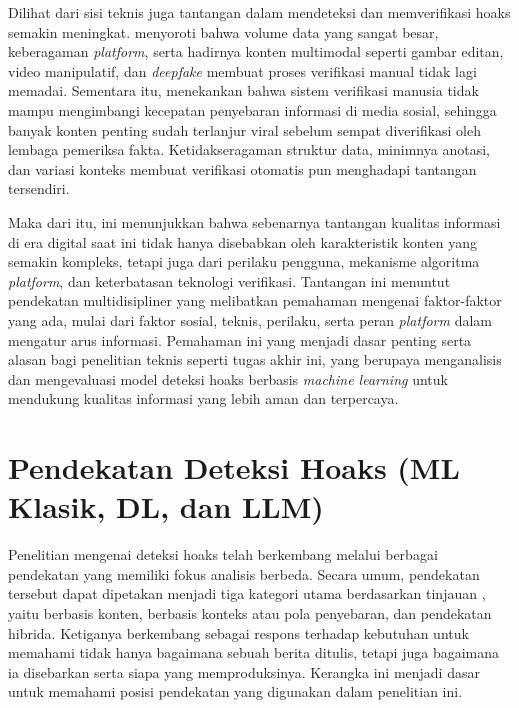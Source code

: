 Dilihat dari sisi teknis juga tantangan dalam mendeteksi dan memverifikasi hoaks semakin meningkat. \textcite{emilremus2025} menyoroti bahwa volume data yang sangat besar, keberagaman \textit{platform}, serta hadirnya konten multimodal seperti gambar editan, video manipulatif, dan \textit{deepfake} membuat proses verifikasi manual tidak lagi memadai. Sementara itu, \textcite{alghamdi2024comprehensive} menekankan bahwa sistem verifikasi manusia tidak mampu mengimbangi kecepatan penyebaran informasi di media sosial, sehingga banyak konten penting sudah terlanjur viral sebelum sempat diverifikasi oleh lembaga pemeriksa fakta. Ketidakseragaman struktur data, minimnya anotasi, dan variasi konteks membuat verifikasi otomatis pun menghadapi tantangan tersendiri.

Maka dari itu, ini menunjukkan bahwa sebenarnya tantangan kualitas informasi di era digital saat ini tidak hanya disebabkan oleh karakteristik konten yang semakin kompleks, tetapi juga dari perilaku pengguna, mekanisme algoritma \textit{platform}, dan keterbatasan teknologi verifikasi. Tantangan ini menuntut pendekatan multidisipliner yang melibatkan pemahaman mengenai faktor-faktor yang ada, mulai dari faktor sosial, teknis, perilaku, serta peran \textit{platform} dalam mengatur arus informasi. Pemahaman ini yang menjadi dasar penting serta alasan bagi penelitian teknis seperti tugas akhir ini, yang berupaya menganalisis dan mengevaluasi model deteksi hoaks berbasis \textit{machine learning} untuk mendukung kualitas informasi yang lebih aman dan terpercaya.


\section{Pendekatan Deteksi Hoaks (ML Klasik, DL, dan LLM)}

Penelitian mengenai deteksi hoaks telah berkembang melalui berbagai pendekatan yang memiliki fokus analisis berbeda. Secara umum, pendekatan tersebut dapat dipetakan menjadi tiga kategori utama berdasarkan tinjauan \textcite{alghamdi2024comprehensive}, yaitu berbasis konten, berbasis konteks atau pola penyebaran, dan pendekatan hibrida. Ketiganya berkembang sebagai respons terhadap kebutuhan untuk memahami tidak hanya bagaimana sebuah berita ditulis, tetapi juga bagaimana ia disebarkan serta siapa yang memproduksinya. Kerangka ini menjadi dasar untuk memahami posisi pendekatan yang digunakan dalam penelitian ini.

